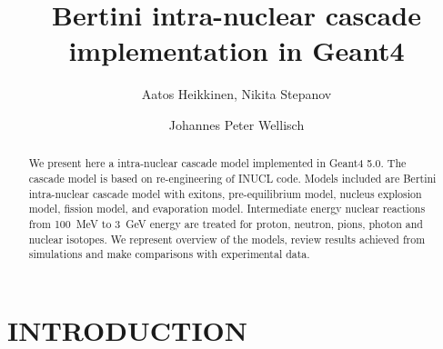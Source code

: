 \documentclass[twocolumn,twoside,slac,floatfix]{revtex4}
\begin{document}
\title{Bertini intra-nuclear cascade implementation in Geant4}

\author{Aatos Heikkinen, Nikita Stepanov} 


\author{Johannes Peter Wellisch}
\begin{abstract}

We present here a intra-nuclear cascade model implemented in Geant4 5.0. 
The cascade model is based on re-engineering of INUCL code.
Models included are Bertini intra-nuclear cascade model with exitons, pre-equilibrium model, nucleus explosion model, 
fission model, and evaporation model.
Intermediate energy nuclear reactions from 100~MeV to 3~GeV energy are treated for proton, neutron, pions, photon and nuclear isotopes.
We represent overview of the models, review results achieved from simulations and make comparisons with experimental data.

\end{abstract}

\maketitle

\thispagestyle{fancy}



\section{INTRODUCTION}
\end{document}
